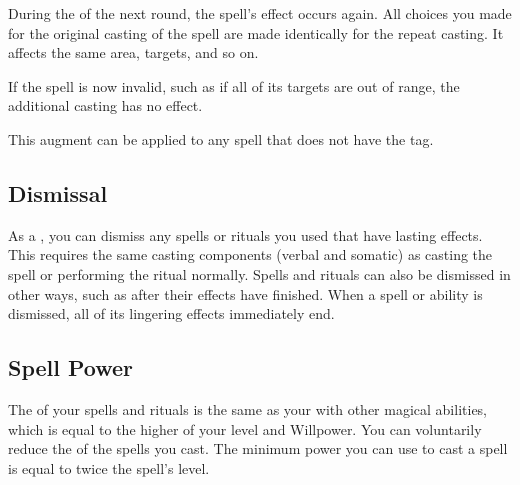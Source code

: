 
             During the  of the next round, the spell's effect occurs again.
            All choices you made for the original casting of the spell are made identically for the repeat casting.
            It affects the same area, targets, and so on.

            If the spell is now invalid, such as if all of its targets are out of range, the additional casting has no effect.
            \par This augment can be applied to any spell that does not have the  tag.

    \subsection{Dismissal}
        As a , you can dismiss any spells or rituals you used that have lasting effects.
        This requires the same casting components (verbal and somatic) as casting the spell or performing the ritual normally.
        Spells and rituals can also be dismissed in other ways, such as after their effects have finished.
        When a spell or ability is dismissed, all of its lingering effects immediately end.

    \subsection{Spell Power}

        The  of your spells and rituals is the same as your  with other magical abilities, which is equal to the higher of your level and Willpower.
        You can voluntarily reduce the  of the spells you cast.
        The minimum power you can use to cast a spell is equal to twice the spell's level.

